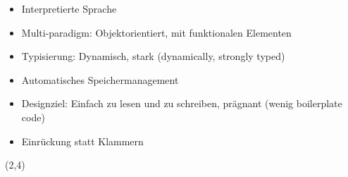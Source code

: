 \begin{frame}[fragile]{}
    \begin{itemize}
        \item Interpretierte Sprache
        \item<4-> Multi-paradigm: Objektorientiert, mit funktionalen Elementen
        \item<4-> Typisierung: Dynamisch, stark (dynamically, strongly typed)
        \item<6-> Automatisches Speichermanagement
        \item<7-> Designziel: Einfach zu lesen und zu schreiben, prägnant (wenig boilerplate code)
        \item<7-> Einrückung statt Klammern
    \end{itemize}
     {
        \begin{textblock}{10}(2,4)
            \begin{figure}

\end{figure}
\end{textblock}}
\end{frame}
